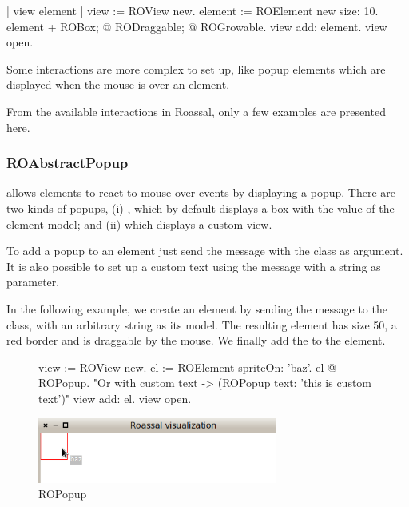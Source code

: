 \documentclass[a4paper,10pt,twoside]{book}
\begin{document}
\begin{code}{}
| view element |
view := ROView new.
element := ROElement new size: 10.
element 
	+ ROBox;
	@ RODraggable; 
	@ ROGrowable.
view add: element.
view open.
\end{code}


Some interactions are more complex to set up, like popup elements which are displayed when the mouse is over an element. 

From the available interactions in Roassal, only a few examples are presented here.

\subsubsection{ROAbstractPopup}

 allows elements to react to mouse over events by displaying a popup. There are two kinds of popups, (i) , which by default displays a box with the  value of the element model; and (ii)  which displays a custom view.

To add a popup to an element just send the  message with the  class as argument. It is also possible to set up a custom text using the  message with a string as parameter. 

In the following example, we create an element by sending the  message to the  class, with an arbitrary string as its model. The resulting element has size 50, a red border and is draggable by the mouse. We finally add the  to the element.


\begin{figure}[H]
      \begin{minipage}[t]{1\textwidth}
      \vspace{0pt}
     \begin{code}{}
view := ROView new.
el := ROElement spriteOn: 'baz'.
el @ ROPopup. "Or with custom text -> (ROPopup text: 'this is custom text')"
view add: el.
view open.
\end{code}
   \end{minipage}
   \hfill
   \begin{minipage}[t]{1\textwidth}
	 \vspace{0pt} \raggedright
       \centering
		\includegraphics[width=0.7\textwidth]{popup}
   \end{minipage}
\label{fig:popup}
\caption{ROPopup}
\end{figure} 
\end{document}
